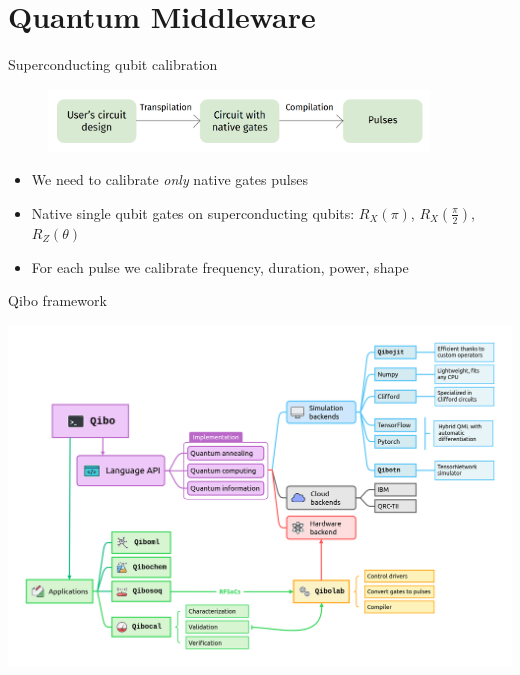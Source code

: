 \documentclass[aspectratio=169,10pt]{beamer}
\begin{document}
\section{Quantum Middleware}

\begin{frame}{Superconducting qubit calibration}
  
  \begin{figure}
    \centering
    \includegraphics[width=0.9\textwidth]{figures/calibration.png}
  \end{figure}
  \vspace{1.5em}
  \begin{itemize}
    \item We need to calibrate \textit{only} native gates pulses
    \item Native single qubit gates on superconducting qubits: $R_X(\pi)$, $R_X(\frac{\pi}{2})$, $R_Z(\theta)$
    \item For each pulse we calibrate frequency, duration, power, shape
  \end{itemize}
\end{frame}

\begin{frame}[t,fragile]{Qibo framework}
  \begin{center}
      \includegraphics[height=0.80\paperheight]{figures/qibo_ecosystem.png}
  \end{center}
\end{frame}
\end{document}

